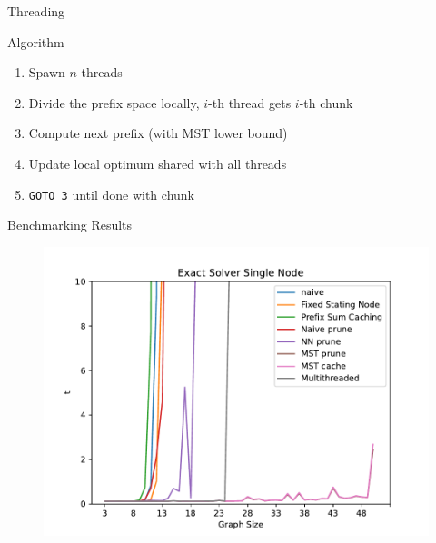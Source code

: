 \begin{frame}{Threading}
  \begin{block}{Algorithm}
    \begin{enumerate}
        \pause
      \item Spawn $n$ threads
        \pause
      \item Divide the prefix space locally, $i$-th thread gets $i$-th chunk
        \pause
      \item Compute next prefix (with MST lower bound)
        \pause
      \item Update local optimum shared with all threads
        \pause
      \item \texttt{GOTO 3} until done with chunk
    \end{enumerate}
  \end{block}
\end{frame}
\begin{frame}{Benchmarking Results}
  \vspace{-0.25cm}
  \begin{figure}
    \includegraphics[width=\linewidth,height=.9\textheight,keepaspectratio]{./assets/v7.pdf}
  \end{figure}
\end{frame}

